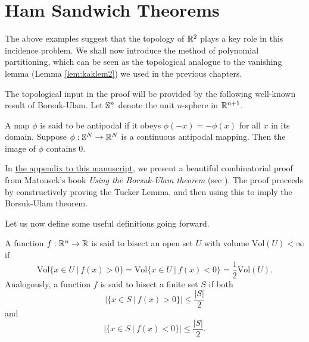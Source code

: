 \section{Ham Sandwich Theorems \label{sect:ham-sandwich-thms}}
The above examples suggest that the topology of $\mathbb R^2$ plays a key role in this incidence problem. We shall now introduce the method of polynomial partitioning,
which can be seen as the topological analogue to the vanishing lemma (Lemma \ref{lem:kaklem2}) we used in the previous chapters. 

The topological input in the proof will be provided by the following well-known result of Borsuk-Ulam.
Let $\mathbb S^n$ denote the unit $n$-sphere in $\mathbb R^{n+1}$. 
\begin{theorem}
    A map $\phi$ is said to be antipodal if it obeys $\phi (-x) = -\phi(x)$ for all $x$ in its domain. Suppose $\phi: \mathbb S^N \to \mathbb R^N$ is a continuous antipodal mapping. 
    Then the image of $\phi$ contains 0. \label{thm:Borsuk-Ulam}
\end{theorem}
In \hyperref[appendix:Borsuk-Ulam]{the appendix to this manuscript}, we present a beautiful combinatorial proof from Matousek's book \textit{Using the Borsuk-Ulam theorem} (see \cite{matouvsek2003using}).
The proof proceeds by constructively proving the Tucker Lemma, and then using this to imply the Borsuk-Ulam theorem.

Let us now define some useful definitions going forward. 
\begin{definition}
A function $f :\mathbb R^n \to \mathbb R$ is said to bisect an open set $U$ with volume $\text{Vol}(U) < \infty$ if
\[
    \text{Vol}\{x \in U \ | \ f(x) > 0 \} = \text{Vol}\{x \in U \ | \ f(x) < 0 \} = \frac{1}{2} \text{Vol}(U).
\]
Analogously, a function $f$ is said to bisect a finite set $S$ if both
\[
  |\{x \in S \ | \ f(x) > 0\}| \leq \frac{|S|}{2}   
\]
and 
\[
  |\{x \in S \ | \ f(x) < 0\}| \leq \frac{|S|}{2}.
\]

\end{definition}

